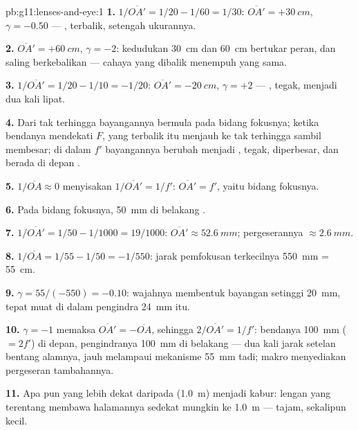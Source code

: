 \begin{solution}{pb:g11:lenses-and-eye:1}
\textbf{1.} $1/\overline{OA'} = 1/20 - 1/60 = 1/30$:
$\overline{OA'} = +\qty{30}{cm}$, $\gamma = -0.50$ --- , terbalik,
setengah ukurannya.

\textbf{2.} $\overline{OA'} = +\qty{60}{cm}$, $\gamma = -2$: kedudukan
\qty{30}{cm} dan \qty{60}{cm} bertukar peran, dan  saling
berkebalikan --- cahaya yang dibalik menempuh  yang sama.

\textbf{3.} $1/\overline{OA'} = 1/20 - 1/10 = -1/20$:
$\overline{OA'} = \qty{-20}{cm}$, $\gamma = +2$ --- , tegak,
menjadi dua kali lipat.

\textbf{4.} Dari tak terhingga bayangannya bermula pada bidang
fokusnya; ketika bendanya mendekati $F$,  yang terbalik
itu menjauh ke tak terhingga sambil membesar; di dalam $f'$ bayangannya
berubah menjadi , tegak, diperbesar, dan berada di depan .

\textbf{5.} $1/\overline{OA} \approx 0$ menyisakan
$1/\overline{OA'} = 1/f'$: $\overline{OA'} = f'$, yaitu bidang
fokusnya.

\textbf{6.} Pada bidang fokusnya, \qty{50}{mm} di belakang .

\textbf{7.} $1/\overline{OA'} = 1/50 - 1/1000 = 19/1000$:
$\overline{OA'} \approx \qty{52.6}{mm}$; pergeserannya
$\approx \qty{2.6}{mm}$.

\textbf{8.} $1/\overline{OA} = 1/55 - 1/50 = -1/550$: jarak pemfokusan
terkecilnya \qty{550}{mm} = \qty{55}{cm}.

\textbf{9.} $\gamma = 55/(-550) = -0.10$: wajahnya membentuk bayangan
setinggi \qty{20}{mm}, tepat muat di dalam pengindra \qty{24}{mm} itu.

\textbf{10.} $\gamma = -1$ memaksa $\overline{OA'} = -\overline{OA}$,
sehingga $2/\overline{OA'} = 1/f'$: bendanya \qty{100}{mm} ($= 2f'$) di
depan, pengindranya \qty{100}{mm} di belakang --- dua kali jarak
setelan bentang alamnya, jauh melampaui mekanisme \qty{55}{mm} tadi;
 makro menyediakan pergeseran tambahannya.

\textbf{11.} Apa pun yang lebih dekat daripada 
(\qty{1.0}{m}) menjadi kabur: lengan yang terentang membawa halamannya
sedekat mungkin ke \qty{1.0}{m} --- tajam, sekalipun kecil.


\end{solution}
